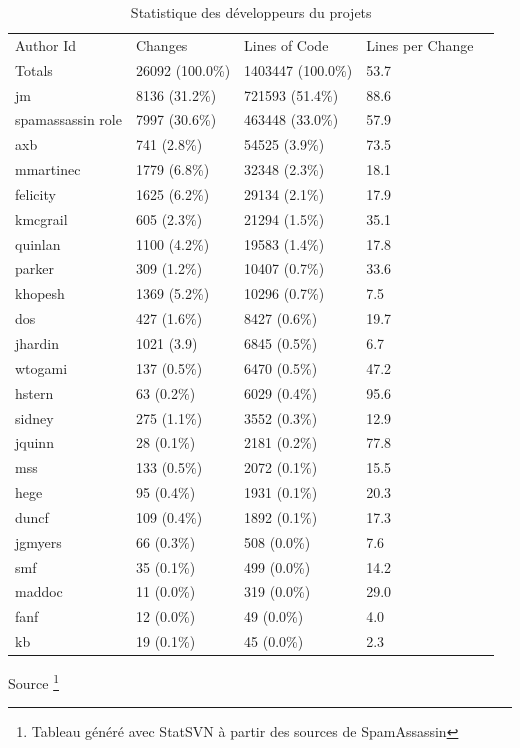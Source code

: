 \documentclass[a4paper,11pt]{article}
\begin{document}
\begin{table}
 
\begin{center}
\begin{tabular}{lllll}

\rowcolor{tcA}
 Author Id & Changes & Lines of Code & Lines per Change\\
\rowcolor{tcA}
 Totals & 26092 (100.0\%) & 1403447 (100.0\%) & 53.7\\
\rowcolor{tcA}
  jm & 8136 (31.2\%) & 721593 (51.4\%) & 88.6\\
\rowcolor{tcA}
  spamassassin role & 7997 (30.6\%) & 463448 (33.0\%) & 57.9\\
\rowcolor{tcA}
  axb & 741 (2.8\%) & 54525 (3.9\%) & 73.5\\
\rowcolor{tcA}
  mmartinec & 1779 (6.8\%) & 32348 (2.3\%) & 18.1\\
\rowcolor{tcA}
  felicity & 1625 (6.2\%) & 29134 (2.1\%) & 17.9\\
\rowcolor{tcA}
  kmcgrail & 605 (2.3\%) & 21294 (1.5\%) & 35.1\\
\rowcolor{tcA}
  quinlan & 1100 (4.2\%) & 19583 (1.4\%) & 17.8\\
\rowcolor{tcA}
  parker & 309 (1.2\%) & 10407 (0.7\%) & 33.6\\
\rowcolor{tcA}
  khopesh & 1369 (5.2\%) & 10296 (0.7\%) & 7.5\\
\rowcolor{tcA}
  dos & 427 (1.6\%) & 8427 (0.6\%) & 19.7\\
\rowcolor{tcA}
  jhardin & 1021 (3.9) & 6845 (0.5\%) & 6.7\\
\rowcolor{tcA}
  wtogami & 137 (0.5\%) & 6470 (0.5\%) & 47.2\\
\rowcolor{tcA}
  hstern & 63 (0.2\%) & 6029 (0.4\%) & 95.6\\
\rowcolor{tcA}
  sidney & 275 (1.1\%) & 3552 (0.3\%) & 12.9\\
\rowcolor{tcA}
  jquinn & 28 (0.1\%) & 2181 (0.2\%) & 77.8\\
\rowcolor{tcA}
  mss & 133 (0.5\%) & 2072 (0.1\%) & 15.5\\
\rowcolor{tcA}
 hege & 95 (0.4\%) & 1931 (0.1\%) & 20.3\\
\rowcolor{tcA}
 duncf & 109 (0.4\%) & 1892 (0.1\%) & 17.3\\
\rowcolor{tcA}
  jgmyers & 66 (0.3\%) & 508 (0.0\%) & 7.6\\
\rowcolor{tcA}
  smf & 35 (0.1\%) & 499 (0.0\%) & 14.2\\
\rowcolor{tcA}
  maddoc & 11 (0.0\%) & 319 (0.0\%) & 29.0\\
\rowcolor{tcA}
  fanf & 12 (0.0\%) & 49 (0.0\%) & 4.0\\
\rowcolor{tcA}
  kb & 19 (0.1\%) & 45 (0.0\%) & 2.3
\end{tabular}
\caption{Statistique des développeurs du projets }
\footnotesize{Source \footnote{Tableau généré avec StatSVN à partir des sources de SpamAssassin}}
\label{tab:devs}
\end{center}
\end{table}
\end{document}
